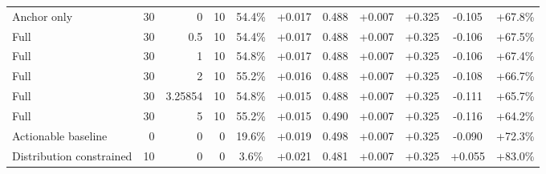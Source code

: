 \begin{table}[htbp]
\begin{tabular}{lrrrccccccc}
Anchor only & 30 & 0 & 10 & 54.4\% & +0.017 & 0.488 & +0.007 & +0.325 & -0.105 & +67.8\% \\
Full & 30 & 0.5 & 10 & 54.4\% & +0.017 & 0.488 & +0.007 & +0.325 & -0.106 & +67.5\% \\
Full & 30 & 1 & 10 & 54.8\% & +0.017 & 0.488 & +0.007 & +0.325 & -0.106 & +67.4\% \\
Full & 30 & 2 & 10 & 55.2\% & +0.016 & 0.488 & +0.007 & +0.325 & -0.108 & +66.7\% \\
Full & 30 & 3.25854 & 10 & 54.8\% & +0.015 & 0.488 & +0.007 & +0.325 & -0.111 & +65.7\% \\
Full & 30 & 5 & 10 & 55.2\% & +0.015 & 0.490 & +0.007 & +0.325 & -0.116 & +64.2\% \\
Actionable baseline & 0 & 0 & 0 & 19.6\% & +0.019 & 0.498 & +0.007 & +0.325 & -0.090 & +72.3\% \\
Distribution constrained & 10 & 0 & 0 & 3.6\% & +0.021 & 0.481 & +0.007 & +0.325 & +0.055 & +83.0\% \\
\bottomrule
\end{tabular}
\end{table}